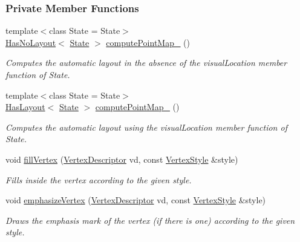 \subsubsection*{Private Member Functions}
\begin{DoxyCompactItemize}
\item 
{\footnotesize template$<$class State  = State$>$ }\\\hyperlink{group__LayoutTraits_ga27d19bcdfcf6ace6fba8ccd91863b86d}{Has\+No\+Layout}$<$ \hyperlink{structDrawer_a885374e914d2706604a45c4615da1a94}{State} $>$ \hyperlink{structDrawer_a7aa445e37b1d97f5dad696e1090492bb}{compute\+Point\+Map\+\_\+} ()
\begin{DoxyCompactList}\small\item\em Computes the automatic layout in the absence of the {\ttfamily visual\+Location} member function of {\ttfamily State}. \end{DoxyCompactList}\item 
{\footnotesize template$<$class State  = State$>$ }\\\hyperlink{group__LayoutTraits_gafe4e4c85f662ba4dcaf4228dc7967941}{Has\+Layout}$<$ \hyperlink{structDrawer_a885374e914d2706604a45c4615da1a94}{State} $>$ \hyperlink{structDrawer_af0c4aa7e19a2ba6b6271672c1a276b41}{compute\+Point\+Map\+\_\+} ()
\begin{DoxyCompactList}\small\item\em Computes the automatic layout using the {\ttfamily visual\+Location} member function of {\ttfamily State}. \end{DoxyCompactList}\item 
void \hyperlink{structDrawer_a32faad1fed06d78dbda29019ff40f2f8}{fill\+Vertex} (\hyperlink{structDrawer_a5bccdf5b5e846fb1a958dca6b5f0a1f6}{Vertex\+Descriptor} vd, const \hyperlink{structVertexStyle}{Vertex\+Style} \&style)
\begin{DoxyCompactList}\small\item\em Fills inside the vertex according to the given style. \end{DoxyCompactList}\item 
void \hyperlink{structDrawer_a76fca15330a0cc76a90bac0544ef177a}{emphasize\+Vertex} (\hyperlink{structDrawer_a5bccdf5b5e846fb1a958dca6b5f0a1f6}{Vertex\+Descriptor} vd, const \hyperlink{structVertexStyle}{Vertex\+Style} \&style)
\begin{DoxyCompactList}\small\item\em Draws the emphasis mark of the vertex (if there is one) according to the given style. \end{DoxyCompactList}\item 

\end{DoxyCompactItemize}
